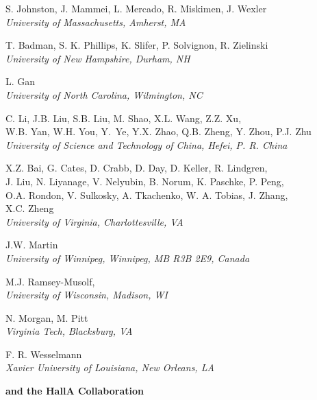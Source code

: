 \documentclass[12pt]{article}
\begin{document}
\begin{center}
\large{S. Johnston, J. Mammei, L. Mercado, R. Miskimen, J. Wexler}\\   
\it{University of Massachusetts, Amherst, MA}
\end{center}

\begin{center}
\large{T. Badman, S. K. Phillips, K. Slifer, P. Solvignon, R. Zielinski}\\   
\it{University of New Hampshire, Durham, NH}
\end{center}

\begin{center}
\large{L. Gan}\\   
\it{University of North Carolina, Wilmington, NC}
\end{center}


\begin{center}
\large {C. Li, J.B. Liu, S.B. Liu, M. Shao, X.L. Wang, Z.Z. Xu, \\ W.B. Yan, W.H. You,
Y.~Ye, Y.X. Zhao, Q.B. Zheng, Y. Zhou, P.J. Zhu}\\
\it{University of Science and Technology of China, Hefei, P. R. China}
\end{center}

\begin{center}
\large{X.Z. Bai, G. Cates, D. Crabb, D. Day, D. Keller, R. Lindgren,\\
  J. Liu, N. Liyanage, V. Nelyubin, 
  B. Norum,  K. Paschke, P. Peng,\\ O.A. Rondon, V. Sulkosky, A. Tkachenko, W. A. Tobias, J. Zhang, \\ X.C. Zheng} \\   
\it{University of Virginia, Charlottesville, VA}
\end{center}


\begin{center}
\large{J.W. Martin}\\   
\it{University of Winnipeg, Winnipeg, MB R3B 2E9, Canada}
\end{center}

\begin{center}
\large{ M.J. Ramsey-Musolf,}\\   
\it{University of Wisconsin, Madison, WI}
\end{center}

\begin{center}
\large {N. Morgan, M. Pitt}\\
\it{Virginia Tech, Blacksburg, VA}
\end{center}

\begin{center}
\large {F. R. Wesselmann}\\
\it{Xavier University of Louisiana, New Orleans, LA}
\end{center}

\begin{center}
\large\bf{and the HallA Collaboration}
\end{center}



\end{document}
